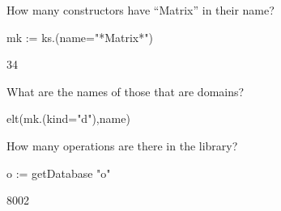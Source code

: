 {{{{{{{\begin{xtc}
\begin{TeXOutput}
\end{TeXOutput}
\end{xtc}
\begin{xtc}
\begin{xtccomment}
How many constructors have ``Matrix'' in their name?
\end{xtccomment}
\begin{spadsrc}
mk := ks.(name="*Matrix*")
\end{spadsrc}
\begin{TeXOutput}
\begin{fricasmath}{4}
34%
\end{fricasmath}
\end{TeXOutput}
\end{xtc}
\begin{xtc}
\begin{xtccomment}
What are the names of those that are domains?
\end{xtccomment}
\begin{spadsrc}
elt(mk.(kind="d"),name)
\end{spadsrc}
\begin{TeXOutput}
\begin{fricasmath}{5}
%
\end{fricasmath}
\end{TeXOutput}
\end{xtc}
\begin{xtc}
\begin{xtccomment}
How many operations are there in the library?
\end{xtccomment}
\begin{spadsrc}
o := getDatabase "o"
\end{spadsrc}
\begin{TeXOutput}
\begin{fricasmath}{6}
8002%
\end{fricasmath}
\end{TeXOutput}

\end{xtc}}}}}}}}
